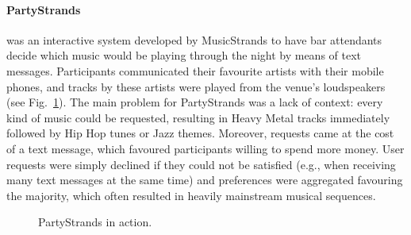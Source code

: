 \paragraph{PartyStrands} %
\label{par:partystrands}
\cite{Strands06} was an interactive system developed by MusicStrands to have bar attendants decide which music would be playing through the night by means of text messages. 
Participants communicated their favourite artists with their mobile phones, and tracks by these artists were played from the venue's loudspeakers (see Fig.~\ref{fig:partystrands}).
The main problem for PartyStrands was a lack of context: every kind of music could be requested, resulting in Heavy Metal tracks immediately followed by Hip Hop tunes or Jazz themes. Moreover, requests came at the cost of a text message, which favoured participants willing to spend more money. 
User requests were simply declined if they could not be satisfied (e.g., when receiving many text messages at the same time) and preferences were aggregated favouring the majority, which often resulted in heavily mainstream musical sequences.
%
\begin{figure}[bthp]
\centering \setlength{\abovecaptionskip}{3pt}
\caption{PartyStrands in action.}
\label{fig:partystrands}
\end{figure}





